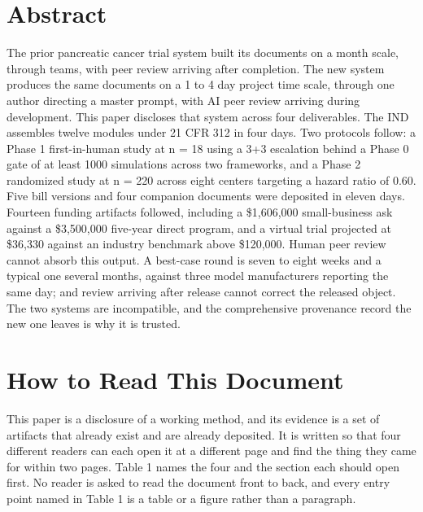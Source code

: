 \section*{Abstract}

The prior pancreatic cancer trial system built its documents on a month
scale, through teams, with peer review arriving after completion. The new
system produces the same documents on a 1 to 4 day project time scale, through
one author directing a master prompt, with AI peer review arriving during
development. This paper discloses that system across four deliverables. The IND
assembles twelve modules under 21 CFR 312 in four days. Two protocols follow: a
Phase 1 first-in-human study at n = 18 using a 3+3 escalation behind a Phase 0
gate of at least 1000 simulations across two frameworks, and a Phase 2
randomized study at n = 220 across eight centers targeting a hazard ratio of
0.60. Five bill versions and four companion documents were deposited in eleven
days. Fourteen funding artifacts followed, including a \$1,606,000
small-business ask against a \$3,500,000 five-year direct program, and a virtual
trial projected at \$36,330 against an industry benchmark above \$120,000.
Human peer review cannot absorb this output. A best-case round is seven to eight
weeks and a typical one several months, against three model manufacturers
reporting the same day; and review arriving after release cannot correct the
released object. The two systems are incompatible, and the comprehensive
provenance record the new one leaves is why it is trusted.

\section*{How to Read This Document}

This paper is a disclosure of a working method, and its evidence is a set of
artifacts that already exist and are already deposited. It is written so that
four different readers can each open it at a different page and find the thing
they came for within two pages. Table 1 names the four and the section each
should open first. No reader is asked to read the document front to back, and
every entry point named in Table 1 is a table or a figure rather than a
paragraph.

